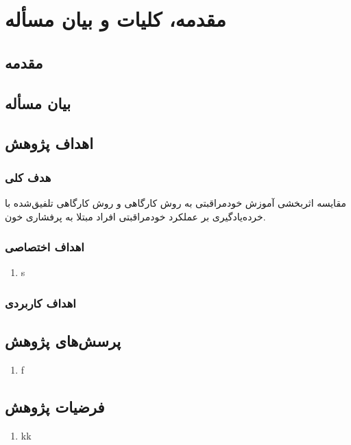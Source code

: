 \ChapterStart
\chapter{مقدمه، کلیات و بیان مسأله}
\label{ch:introduction}
\section{مقدمه}
\label{sec:ch1-intro}



\section{بیان مسأله}
\label{sec:problem-statement}


\section{اهداف پژوهش}
\label{sec:objectives}

\subsection{هدف کلی}
مقایسه اثر‌بخشی آموزش خودمراقبتی به روش کارگاهی و روش کارگاهی تلفیق‌شده با
خرده‌یادگیری بر عملکرد خودمراقبتی افراد مبتلا به پرفشاری خون.

\subsection{اهداف اختصاصی}
\begin{enumerate}[label=\arabic*.]
    \item s
\end{enumerate}

\subsection{اهداف کاربردی}


\section{پرسش‌های پژوهش}
\label{sec:research-questions}
\begin{enumerate}[label=\arabic*.]
    \item f
\end{enumerate}

\section{فرضیات پژوهش}
\label{sec:hypotheses}
\begin{enumerate}[label=\arabic*.]
 \item kk
\end{enumerate}

